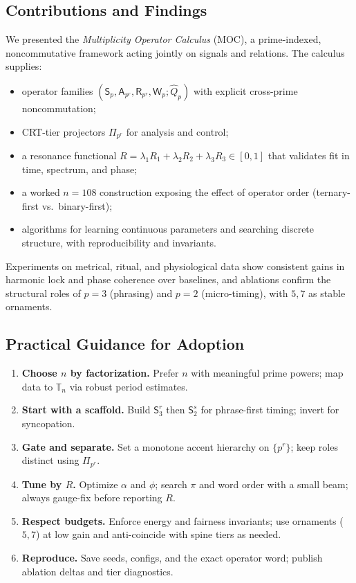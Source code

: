 \documentclass[12pt]{article}
\numberwithin{equation}{section}
\theoremstyle{plain}
\theoremstyle{definition}
\theoremstyle{remark}
\begin{document}
\subsection*{Contributions and Findings}
We presented the \emph{Multiplicity Operator Calculus} (MOC), a prime-indexed, noncommutative framework acting jointly on signals and relations. The calculus supplies:
\begin{itemize}
  \item operator families $(\mathsf{S}_p,\mathsf{A}_{p^r},\mathsf{R}_{p^r},\mathsf{W}_p;\hat{Q}_p)$ with explicit cross-prime noncommutation;
  \item CRT-tier projectors $\Pi_{p^r}$ for analysis and control;
  \item a resonance functional $R=\lambda_1R_1+\lambda_2R_2+\lambda_3R_3\in[0,1]$ that validates fit in time, spectrum, and phase;
  \item a worked $n=108$ construction exposing the effect of operator order (ternary-first vs.\ binary-first);
  \item algorithms for learning continuous parameters and searching discrete structure, with reproducibility and invariants.
\end{itemize}
Experiments on metrical, ritual, and physiological data show consistent gains in harmonic lock and phase coherence over baselines, and ablations confirm the structural roles of $p=3$ (phrasing) and $p=2$ (micro-timing), with $5,7$ as stable ornaments.

\subsection*{Practical Guidance for Adoption}
\begin{enumerate}
  \item \textbf{Choose $n$ by factorization.} Prefer $n$ with meaningful prime powers; map data to $\mathbb{T}_n$ via robust period estimates.
  \item \textbf{Start with a scaffold.} Build $\mathsf{S}_3^r$ then $\mathsf{S}_2^s$ for phrase-first timing; invert for syncopation.
  \item \textbf{Gate and separate.} Set a monotone accent hierarchy on $\{p^r\}$; keep roles distinct using $\Pi_{p^r}$.
  \item \textbf{Tune by $R$.} Optimize $\alpha$ and $\phi$; search $\pi$ and word order with a small beam; always gauge-fix before reporting $R$.
  \item \textbf{Respect budgets.} Enforce energy and fairness invariants; use ornaments ($5,7$) at low gain and anti-coincide with spine tiers as needed.
  \item \textbf{Reproduce.} Save seeds, configs, and the exact operator word; publish ablation deltas and tier diagnostics.
\end{enumerate}
\end{document}
